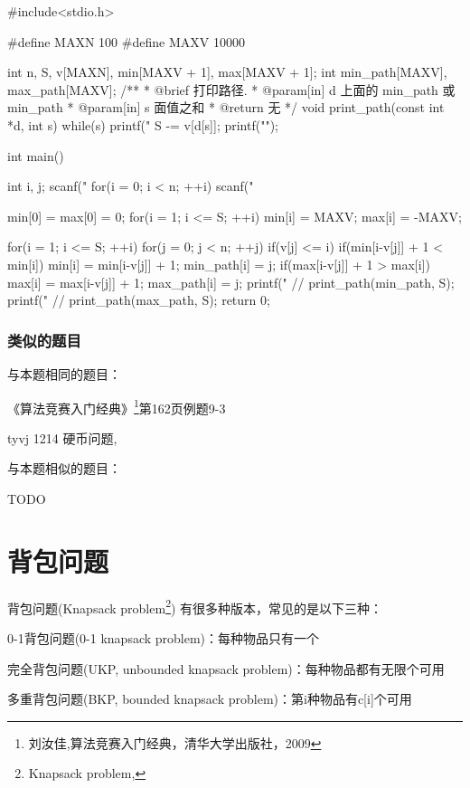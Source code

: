 \begin{Codex}[label=coin_change2.c]
#include<stdio.h>

#define MAXN 100
#define MAXV 10000

int n, S, v[MAXN], min[MAXV + 1], max[MAXV + 1];
int min_path[MAXV], max_path[MAXV];
/**
 * @brief 打印路径.
 * @param[in] d 上面的 min_path 或 min_path
 * @param[in] s 面值之和
 * @return 无
 */
void print_path(const int *d, int s) {
    while(s) {
        printf("%
        S -= v[d[s]];
    }
    printf("\n");
}

int main() {
    int i, j;
    scanf("%
    for(i = 0; i < n; ++i) scanf("%

    min[0] = max[0] = 0;
    for(i = 1; i <= S; ++i) {
        min[i] = MAXV; 
        max[i] = -MAXV;
    }

    for(i = 1; i <= S; ++i) {
        for(j = 0; j < n; ++j) if(v[j] <= i) {
            if(min[i-v[j]] + 1 < min[i]) {
                min[i] = min[i-v[j]] + 1;
                min_path[i] = j;
            }
            if(max[i-v[j]] + 1 > max[i]) {
                max[i] = max[i-v[j]] + 1;
                max_path[i] = j;
            }
        }
    }
    printf("%
    // print_path(min_path, S);
    printf("%
    // print_path(max_path, S);
    return 0;
}
\end{Codex}

\subsubsection{类似的题目}
与本题相同的题目：
\begindot
\item 《算法竞赛入门经典》\footnote{刘汝佳,算法竞赛入门经典，清华大学出版社，2009}第162页例题9-3
\item  tyvj 1214 硬币问题, 
\myenddot

与本题相似的题目：
\begindot
\item  TODO
\myenddot

\section{背包问题} %
背包问题(Knapsack problem\footnote{Knapsack problem, })
有很多种版本，常见的是以下三种：
\begindot
\item 0-1背包问题(0-1 knapsack problem)：每种物品只有一个
\item 完全背包问题(UKP, unbounded knapsack problem)：每种物品都有无限个可用
\item 多重背包问题(BKP, bounded knapsack problem)：第i种物品有c[i]个可用
\myenddot

